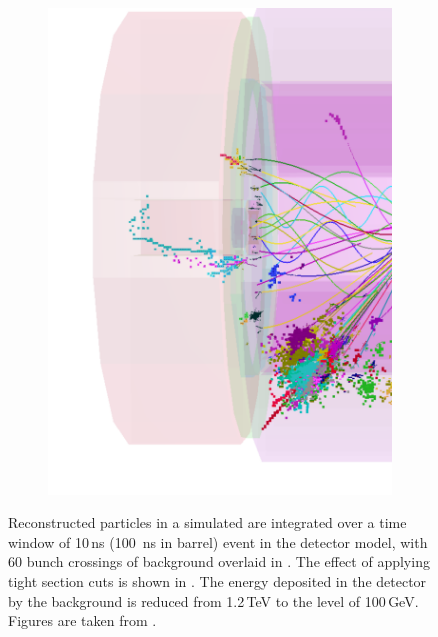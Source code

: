 \begin{figure}[tbph]
\begin{subfigure}[b]{0.45\textwidth}
    \includegraphics[width=\textwidth]{pandora/evtDisplayggHad2}
    \caption{}
    \label{fig:pandoraEvtDisplayggHad2}
  \end{subfigure}
\caption[Effect of the suppression of the background with the tight \PFO selection.]
{Reconstructed particles  in a simulated \HepProcess{\Pep\Pem \to \PHiggs\PHiggs \to \Ptop\APbottom\Pbottom\APtop}  are integrated over a time window of 10\,ns (100 \,ns in \HCAL barrel) event in the \CLICILD detector model, with 60 bunch crossings of \ggHad background overlaid in . The effect of applying tight \PFO section cuts is shown in . The energy deposited in the detector by the background is reduced from 1.2\,TeV to the level of 100\,GeV. Figures are taken from \cite{Marshall:2012ry}.}
\label{fig:pandoraEvtDisplayggHad}
\end{figure}




